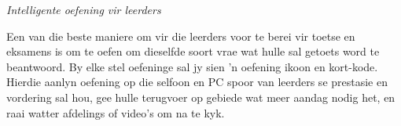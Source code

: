 \newpage
\thispagestyle{empty}
{\Large


{\normalfont\sffamily\fontsize{22}\normalfont\itshape Intelligente oefening vir leerders} \par


Een van die beste maniere om vir die leerders voor te berei vir toetse en eksamens is om te oefen om dieselfde soort vrae wat hulle sal getoets word te beantwoord. By elke stel oefeninge sal jy sien 'n oefening ikoon en kort-kode. 
Hierdie aanlyn oefening op die selfoon en PC spoor van leerders se prestasie en vordering sal hou, gee hulle terugvoer op gebiede wat meer aandag nodig het, en raai watter afdelings of video's om na te kyk. \par


}
